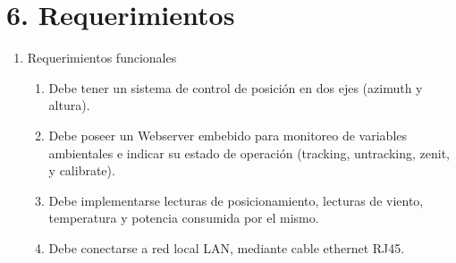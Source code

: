 \documentclass[11pt, %
codirector, %
]{charter}
\begin{document}
\section{6. Requerimientos}
\label{sec:requerimientos}

\begin{enumerate}
	\item Requerimientos funcionales
		\begin{enumerate}
			\item Debe tener un sistema de control de posición en dos ejes (azimuth y altura).
			
			\item Debe poseer un Webserver embebido para monitoreo de variables ambientales e indicar su estado de operación (tracking, untracking, zenit, y calibrate). 
			\item Debe implementarse lecturas de posicionamiento, lecturas de viento, temperatura y potencia consumida por el mismo. 
			\item Debe conectarse a red local LAN, mediante cable ethernet RJ45. 
			

\end{enumerate}
\end{enumerate}
\end{document}
